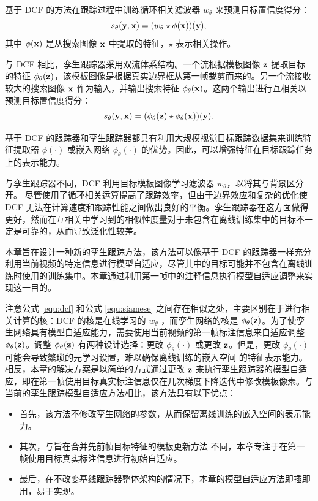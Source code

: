 基于 DCF 的方法在跟踪过程中训练循环相关滤波器 $w_{\theta}$ 来预测目标置信度得分：
\begin{equation}
    s_\theta(\textbf y,\textbf x)=(w_\theta \star \phi(\textbf x))(\textbf y),
    \label{equ:dcf}
\end{equation}
其中 $\phi(\textbf x)$ 是从搜索图像 $\textbf x$ 中提取的特征，$\star$ 表示相关操作。

与 DCF 相比，孪生跟踪器采用双流体系结构。一个流根据模板图像 $\textbf z$ 提取目标的特征 $\phi_\theta(\textbf z)$，该模板图像是根据真实边界框从第一帧裁剪而来的。另一个流接收较大的搜索图像 $\textbf x$ 作为输入，并输出搜索特征 $\phi_\theta(\textbf x)$。这两个输出进行互相关以预测目标置信度得分：
\begin{equation}
    s_\theta(\textbf y,\textbf x)=(\phi_\theta(\textbf z) \star \phi_\theta(\textbf x))(\textbf y).
    \label{equ:siamese}
\end{equation}

基于 DCF 的跟踪器和孪生跟踪器都具有利用大规模视觉目标跟踪数据集来训练特征提取器 $\phi(\cdot)$ 或嵌入网络 $\phi_{\theta}(\cdot)$ 的优势。因此，可以增强特征在目标跟踪任务上的表示能力。

与孪生跟踪器不同，DCF 利用目标模板图像学习滤波器 $w_\theta$，以将其与背景区分开。
尽管使用了循环相关运算提高了跟踪效率，但由于边界效应和复杂的优化使 DCF 无法在计算速度和跟踪性能之间做出良好的平衡。孪生跟踪器在这方面做得更好，然而在互相关中学习到的相似性度量对于未包含在离线训练集中的目标不一定是可靠的，从而导致泛化性较差。

本章旨在设计一种新的孪生跟踪方法，该方法可以像基于 DCF 的跟踪器一样充分利用当前视频的特定信息进行模型自适应，尽管其中的目标可能并不包含在离线训练时使用的训练集中。本章通过利用第一帧中的注释信息执行模型自适应调整来实现这一目的。

注意公式 \ref{equ:dcf} 和公式 \ref{equ:siamese} 之间存在相似之处，主要区别在于进行相关计算的核：DCF 的核是在线学习的 $w_{\theta}$ ，而孪生网络的核是 $\phi_\theta(\textbf z)$。为了使孪生网络具有模型自适应能力，需要使用当前视频的第一帧标注信息来自适应调整 $\phi_\theta(\textbf z)$。调整 $\phi_\theta(\textbf z)$ 有两种设计选择：更改 $\phi_\theta(\cdot)$ 或更改 $\textbf z$。但是，更改 $\phi_\theta(\cdot)$ 可能会导致繁琐的元学习设置，难以确保离线训练的嵌入空间 \cite{ROAM, MetaRTT} 的特征表示能力。相反，本章的解决方案是以简单的方式通过更改 $\textbf z$ 来执行孪生跟踪器的模型自适应，即在第一帧使用目标真实标注信息仅在几次梯度下降迭代中修改模板像素。与当前的孪生跟踪模型自适应方法相比，该方法具有以下优点：

\begin{itemize}
\item 首先，该方法不修改孪生网络的参数，从而保留离线训练的嵌入空间的表示能力。
\item 其次，与旨在合并先前帧目标特征的模板更新方法 \cite{zhu2018distractor, Zhang_2019_ICCV} 不同，本章专注于在第一帧使用目标真实标注信息进行初始自适应。
\item 最后，在不改变基线跟踪器整体架构的情况下，本章的模型自适应方法即插即用，易于实现。
\end{itemize}

